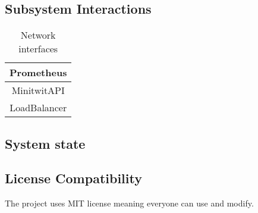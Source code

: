 \subsection{Subsystem Interactions}
\label{subsec:subsystem_interactions}
\begin{table}[h!]
    \centering
    \begin{tabular}{|c|} \hline
         Prometheus \\ \hline
         MinitwitAPI \\ \hline
         LoadBalancer \\ \hline
    \end{tabular}
    \caption{Network interfaces}
    \label{tab:my_label}
\end{table}

\subsection{System state}
\label{subsec:system_state}


\subsection{License Compatibility}
\label{subsec:license_compatability}
The project uses MIT license meaning everyone can use and modify.

